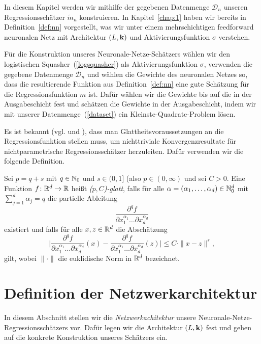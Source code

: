 In diesem Kapitel werden wir mithilfe der gegebenen Datenmenge $\mathcal{D}_n$ unseren Regressionsschätzer $\tilde{m}_n$ konstruieren. 
In Kapitel~\ref{chap:1} haben wir bereits in Definition~\ref{def:nn} vorgestellt, was wir unter einem mehrschichtigen feedforward neuronalen Netz mit Architektur $(L, \mathbf{k})$ und Aktivierungsfunktion $\sigma$ verstehen.

Für die Konstruktion unseres Neuronale-Netze-Schätzers wählen wir den logistischen Squasher~(\ref{logsquasher}) als Aktivierungsfunktion $\sigma$, verwenden die gegebene Datenmenge $\mathcal{D}_n$ und wählen die Gewichte des neuronalen Netzes so, dass die resultierende Funktion aus Definition~\ref{def:nn} eine gute Schätzung für die Regressionsfunktion $m$ ist. Dafür wählen wir die Gewichte bis auf die in der Ausgabeschicht fest und schätzen die Gewichte in der Ausgabeschicht, indem wir mit unserer Datenmenge~(\ref{dataset}) ein Kleinste-Quadrate-Problem lösen.

Es ist bekannt (vgl.\@ \cite[Theorem 7.2 und Problem 7.2]{DevLug96} und \cite[Section 3]{DevWag80}), dass man Glattheitsvoraussetzungen an die Regressionsfunktion stellen muss, um nichttriviale Konvergenzresultate für nichtparametrische Regressionsschätzer herzuleiten. Dafür verwenden wir die folgende Definition.
\begin{defn}[($p,C$)-Glattheit]
\label{def:pc}
   Sei $p = q + s$ mit $q \in \mathbb{N}_0$ und $s \in (0,1]$ (also $p \in (0, \infty)$ und sei $C > 0$. Eine Funktion $f\colon \mathbb{R}^d \to \mathbb{R}$ heißt \emph{($p, C$)-glatt}, falls für alle $\alpha = (\alpha_1,\dots,\alpha_d) \in \mathbb{N}_0^d$ mit $\sum_{j = 1}^{d}\alpha_j = q$ die partielle Ableitung 
   $$ \frac{\partial^qf}{\partial x_1^{\alpha_1}\dots\partial x_d^{\alpha_d}}$$
   existiert und falls für alle $x, z \in \mathbb{R}^d$ die Abschätzung 
   $$ \bigg|\frac{\partial^qf}{\partial x_1^{\alpha_1}\dots\partial x_d^{\alpha_d}}(x) - \frac{\partial^qf}{\partial x_1^{\alpha_1}\dots\partial x_d^{\alpha_d}}(z) \bigg| \leq C \cdot \|x - z\|^s,$$
   gilt, wobei $\|\cdot\|$ die euklidische Norm in $\mathbb{R}^d$ bezeichnet.  
\end{defn}

\section{Definition der Netzwerkarchitektur}
\label{subsec:2:1}
In diesem Abschnitt stellen wir die \emph{Netzwerkachitektur} unsere Neuronale-Netze-Regressionsschätzers vor. Dafür legen wir die Architektur $(L,\mathbf{k})$ fest und gehen auf die konkrete Konstruktion unseres Schätzers ein.

